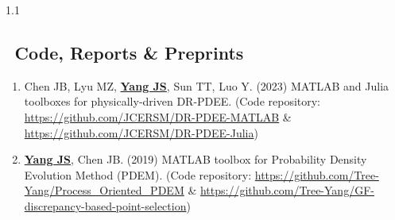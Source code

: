 \documentclass{resume}
\begin{document}
\vspace{-18pt}
\begin{spacing}{1.1}
\subsection{\faFileCode\;\, \textbf{Code, Reports \& Preprints}}
\vspace{10pt}
\begin{enumerate}[itemsep=3pt,topsep=2pt]
  \item Chen JB, Lyu MZ, \underline{\textbf{Yang JS}}, Sun TT, Luo Y. (2023) MATLAB and Julia toolboxes for physically-driven DR-PDEE. (Code repository: \url{https://github.com/JCERSM/DR-PDEE-MATLAB} \& \url{https://github.com/JCERSM/DR-PDEE-Julia})
  
  \item \underline{\textbf{Yang JS}}, Chen JB. (2019) MATLAB toolbox for Probability Density Evolution Method (PDEM). (Code repository: \url{https://github.com/Tree-Yang/Process_Oriented_PDEM} \& \url{https://github.com/Tree-Yang/GF-discrepancy-based-point-selection})

\end{enumerate}
\end{spacing}

\end{document}
